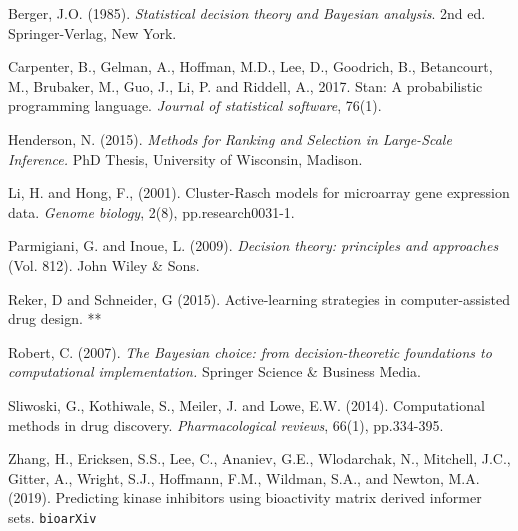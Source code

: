 \documentclass[12pt]{article}
\begin{document}
\begin{list}{}{}
\item Berger, J.O. (1985). {\em Statistical decision theory and Bayesian analysis}. 2nd ed. Springer-Verlag, New York.

\item Carpenter, B., Gelman, A., Hoffman, M.D., Lee, D., Goodrich, B., Betancourt, M., Brubaker, M., Guo, J., Li, P. and Riddell, A., 2017. Stan: A probabilistic programming language. {\em Journal of statistical software}, 76(1).

\item Henderson, N. (2015). {\em Methods for Ranking and Selection in Large-Scale Inference.} PhD Thesis,
University of Wisconsin, Madison.

\item Li, H. and Hong, F., (2001). Cluster-Rasch models for microarray gene expression data. {\em Genome biology}, 2(8), pp.research0031-1.

\item Parmigiani, G. and Inoue, L. (2009). {\em Decision theory: principles and approaches} (Vol. 812). John Wiley \& Sons.

\item Reker, D and Schneider, G (2015). Active-learning 
strategies in computer-assisted drug design. **

\item Robert, C. (2007). {\em The Bayesian choice: from decision-theoretic foundations to computational implementation.} Springer Science \& Business Media.

\item Sliwoski, G., Kothiwale, S., Meiler, J. and Lowe, E.W. (2014). Computational methods in drug discovery. {\em Pharmacological reviews}, 66(1), pp.334-395.

\item  Zhang, H.,   Ericksen, S.S.,  Lee, C.,  Ananiev, G.E., Wlodarchak, N.,  Mitchell, J.C.,  Gitter, A.,  Wright, S.J., Hoffmann, F.M.,  Wildman, S.A., and 
Newton, M.A. (2019). Predicting kinase inhibitors using bioactivity matrix derived informer sets.
\verb+bioarXiv+

\end{list}
\end{document}
